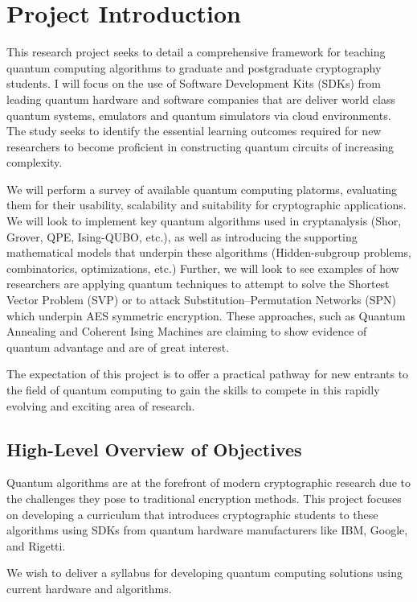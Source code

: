 \documentclass[11pt,a4paper]{article}
\begin{document}
\section{Project Introduction}

This research project seeks to detail a comprehensive framework for teaching quantum computing algorithms to
graduate and postgraduate cryptography students.
I will focus on the use of Software Development Kits (SDKs) from leading quantum hardware and software companies
that are deliver world class quantum systems, emulators and quantum simulators via cloud environments.
The study seeks to identify the essential learning outcomes required for new researchers to become proficient
in constructing quantum circuits of increasing complexity.

We will perform a survey of available quantum computing platorms, evaluating them for their usability, scalability
and suitability for cryptographic applications.  We will look to implement key quantum algorithms used in
cryptanalysis (Shor, Grover, QPE, Ising-QUBO, etc.), as well as introducing the supporting mathematical models that
underpin these algorithms (Hidden-subgroup problems, combinatorics, optimizations, etc.) Further, we will look to
see examples of how researchers are applying quantum techniques to attempt to solve the Shortest Vector Problem (SVP)
or to attack Substitution–Permutation Networks (SPN) which underpin AES symmetric encryption.  These approaches, such as
Quantum Annealing and Coherent Ising Machines are claiming to show evidence of quantum advantage and are of great
interest.

The expectation of this project is to offer a practical pathway for new entrants to the field of quantum computing
to gain the skills to compete in this rapidly evolving and exciting area of research.

\subsection{High-Level Overview of Objectives}

Quantum algorithms are at the forefront of modern cryptographic research due to the challenges they pose to
traditional encryption methods.
This project focuses on developing a curriculum that introduces cryptographic students to these algorithms
using SDKs from quantum hardware manufacturers like IBM, Google, and Rigetti.

We wish to deliver a syllabus for developing quantum computing solutions using current hardware and algorithms.
\end{document}
